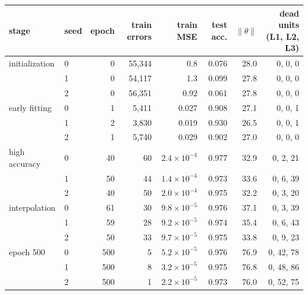 \begin{tabular}{llrrrrrr}
\toprule
stage & seed & epoch & train errors & train MSE & test acc. & $\|\theta\|$ & dead units (L1, L2, L3) \\
\midrule
initialization & 0 & 0 & 55{,}344 & 0.8 & 0.076 & 28.0 & 0, 0, 0 \\
 & 1 & 0 & 54{,}117 & 1.3 & 0.099 & 27.8 & 0, 0, 0 \\
 & 2 & 0 & 56{,}351 & 0.92 & 0.061 & 27.8 & 0, 0, 0 \\
\addlinespace
early fitting & 0 & 1 & 5{,}411 & 0.027 & 0.908 & 27.1 & 0, 0, 1 \\
 & 1 & 2 & 3{,}830 & 0.019 & 0.930 & 26.5 & 0, 0, 1 \\
 & 2 & 1 & 5{,}740 & 0.029 & 0.902 & 27.0 & 0, 0, 0 \\
\addlinespace
high accuracy & 0 & 40 & 60 & $2.4\!\times\!10^{-4}$ & 0.977 & 32.9 & 0, 2, 21 \\
 & 1 & 50 & 44 & $1.4\!\times\!10^{-4}$ & 0.973 & 33.6 & 0, 6, 39 \\
 & 2 & 40 & 50 & $2.0\!\times\!10^{-4}$ & 0.975 & 32.2 & 0, 3, 20 \\
\addlinespace
interpolation & 0 & 61 & 30 & $9.8\!\times\!10^{-5}$ & 0.976 & 37.1 & 0, 3, 39 \\
 & 1 & 59 & 28 & $9.2\!\times\!10^{-5}$ & 0.974 & 35.4 & 0, 6, 43 \\
 & 2 & 50 & 33 & $9.7\!\times\!10^{-5}$ & 0.975 & 33.8 & 0, 9, 23 \\
\addlinespace
epoch 500 & 0 & 500 & 5 & $5.2\!\times\!10^{-5}$ & 0.976 & 76.9 & 0, 42, 78 \\
 & 1 & 500 & 8 & $3.2\!\times\!10^{-5}$ & 0.975 & 76.8 & 0, 48, 86 \\
 & 2 & 500 & 1 & $2.2\!\times\!10^{-5}$ & 0.973 & 76.0 & 0, 52, 75 \\
\bottomrule
\end{tabular}
